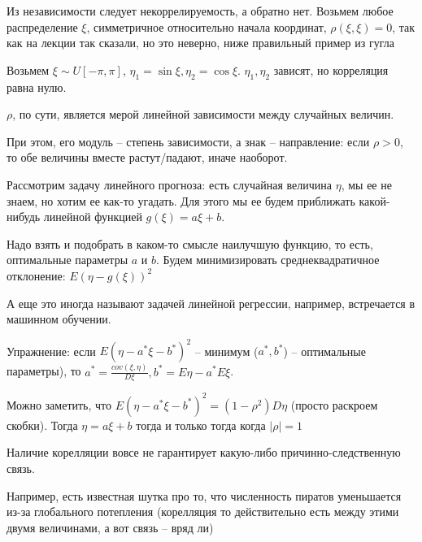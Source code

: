 \begin{Rem}
Из независимости следует некоррелируемость, а обратно нет.
Возьмем любое распределение $\xi$, симметричное относительно начала координат, $\rho(\xi, \xi) = 0$, так как \TODO на лекции так сказали, но это неверно, ниже правильный пример из гугла \TODO

Возьмем $\xi \sim U[-\pi, \pi]$, $\eta_1 = \sin \xi, \eta_2 = \cos \xi$. 
$\eta_1, \eta_2$ зависят, но корреляция равна нулю.
\end{Rem}                                                                                                                                         

\begin{Rem}

    $\rho$, по сути, является мерой линейной зависимости между случайных величин. 

    При этом, его модуль -- степень зависимости, а знак -- направление: если $\rho > 0$, то обе величины вместе растут/падают, иначе наоборот.
\end{Rem}

Рассмотрим задачу линейного прогноза: есть случайная величина $\eta$, мы ее не знаем, но хотим ее как-то угадать.
Для этого мы ее будем приближать какой-нибудь линейной функцией $g(\xi) = a\xi + b$. 

Надо взять и подобрать в каком-то смысле наилучшую функцию, то есть, оптимальные параметры $a$ и $b$. 
Будем минимизировать среднеквадратичное отклонение: $E(\eta - g(\xi))^2$
\begin{Rem}
А еще это иногда называют задачей линейной регрессии, например, встречается в машинном обучении.
\end{Rem}

Упражнение: если $E(\eta - a^*\xi -b^*)^2$ -- минимум ($a^*, b^*$) -- оптимальные параметры), то $a^* = \frac{cov(\xi, \eta)}{D\xi}, b^* = E\eta - a^*E\xi$.

Можно заметить, что $E(\eta - a^*\xi -b^*)^2 = (1 - \rho^2) D\eta$ (просто раскроем скобки). Тогда $\eta =  a\xi + b$ тогда и только тогда когда $|\rho| = 1$

\begin{Rem}
Наличие корелляции вовсе не гарантирует какую-либо причинно-следственную связь. 

Например, есть известная шутка про то, что численность пиратов уменьшается из-за глобального потепления (корелляция то действительно есть между этими двумя величинами, а вот связь -- вряд ли) 
\end{Rem}

